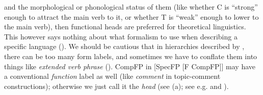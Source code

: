 \documentclass[UTF8, a4paper, oneside, scheme=plain, 12pt]{ctexrep}
\newcommand*{\term}[1]{\emph{#1}}
\newcommand{\form}[1]{\emph{#1}}
\begin{document}
{\begin{itemize}
{        and the morphological or phonological status of them
        (like whether C is ``strong'' enough to attract the main verb to it,
        or whether T is ``weak'' enough to lower to the main verb),
        then functional heads are preferred for theoretical linguistics.
        This however says nothing about what formalism to use 
        when describing a specific language ().
    }
    We should be cautious that in hierarchies described by \citet{cinque1999adverbs},
    there can be too many form labels,
    and sometimes we have to conflate them into things like \form{extended verb phrase}
    ().
    CompFP in [SpecFP [F CompFP]] may have a conventional \emph{function} label as well
    (like \form{comment} in topic-comment constructions);
    otherwise we just call it the \term{head} (see (a); see e.g.  and ).


\end{itemize}}
\end{document}
